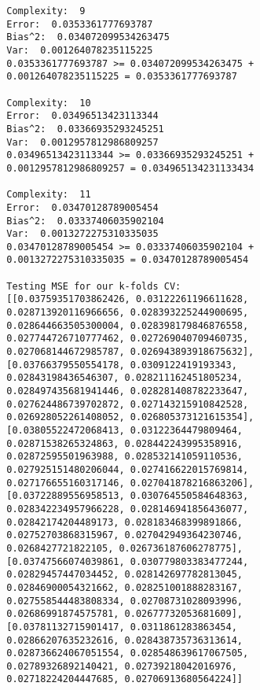 \begin{verbatim}
        Complexity:  9
        Error:  0.0353361777693787
        Bias^2:  0.034072099534263475
        Var:  0.001264078235115225
        0.0353361777693787 >= 0.034072099534263475 + 
        0.001264078235115225 = 0.0353361777693787
        
        Complexity:  10
        Error:  0.03496513423113344
        Bias^2:  0.03366935293245251
        Var:  0.0012957812986809257
        0.03496513423113344 >= 0.03366935293245251 + 
        0.0012957812986809257 = 0.034965134231133434
        
        Complexity:  11
        Error:  0.03470128789005454
        Bias^2:  0.03337406035902104
        Var:  0.0013272275310335035
        0.03470128789005454 >= 0.03337406035902104 + 
        0.0013272275310335035 = 0.03470128789005454
        
        Testing MSE for our k-folds CV:  
        [[0.03759351703862426, 0.03122261196611628,
        0.028713920116966656, 0.028393225244900695,
        0.028644663505300004, 0.028398179846876558,
        0.027744726710777462, 0.027269040709460735,
        0.027068144672985787, 0.026943893918675632],
        [0.03766379550554178, 0.0309122419193343,
        0.02843198436546307, 0.028211162451805234,
        0.028497435681941446, 0.028281408782233647,
        0.027624486739702872, 0.027143215910842528,
        0.026928052261408052, 0.026805373121615354],
        [0.03805522472068413, 0.03122364479809464,
        0.02871538265324863, 0.028442243995358916,
        0.02872595501963988, 0.028532141059110536,
        0.027925151480206044, 0.027416622015769814,
        0.027176655160317146, 0.027041878216863206],
        [0.03722889556958513, 0.030764550584648363,
        0.028342234957966228, 0.028146941856436077,
        0.02842174204489173, 0.028183468399891866,
        0.02752703868315967, 0.027042949364230746,
        0.0268427721822105, 0.026736187606278775],
        [0.03747566074039861, 0.030779803383477244,
        0.02829457447034452, 0.028142697782813045,
        0.02846900054321662, 0.028251001888283167,
        0.027558544483808334, 0.02708731028093996,
        0.02686991874575781, 0.02677732053681609],
        [0.03781132715901417, 0.0311861283863454,
        0.02866207635232616, 0.028438735736313614,
        0.028736624067051554, 0.028548639617067505,
        0.02789326892140421, 0.02739218042016976,
        0.02718224204447685, 0.02706913680564224]]

\end{verbatim}

